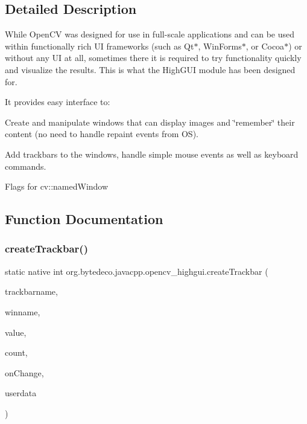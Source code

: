 \subsection{Detailed Description}
While Open\+CV was designed for use in full-\/scale applications and can be used within functionally rich UI frameworks (such as Qt$\ast$, Win\+Forms$\ast$, or Cocoa$\ast$) or without any UI at all, sometimes there it is required to try functionality quickly and visualize the results. This is what the High\+G\+UI module has been designed for. 

It provides easy interface to\+: 


\begin{DoxyItemize}
\item Create and manipulate windows that can display images and \char`\"{}remember\char`\"{} their content (no need to handle repaint events from OS).
\item Add trackbars to the windows, handle simple mouse events as well as keyboard commands. 
\end{DoxyItemize}

Flags for cv\+::named\+Window 

\subsection{Function Documentation}
\mbox{\label{group__highgui_ga727bcca32e6bc9d52ae86894538318fa}} 
\subsubsection{\texorpdfstring{create\+Trackbar()}{createTrackbar()}}
{\footnotesize\ttfamily static native int org.\+bytedeco.\+javacpp.\+opencv\+\_\+highgui.\+create\+Trackbar (\begin{DoxyParamCaption}\item[{@Str Byte\+Pointer}]{trackbarname,  }\item[{@Str Byte\+Pointer}]{winname,  }\item[{Int\+Pointer}]{value,  }\item[{int}]{count,  }\item[{Trackbar\+Callback}]{on\+Change,  }\item[{Pointer}]{userdata }\end{DoxyParamCaption})\hspace{0.3cm}{\ttfamily [static]}}



